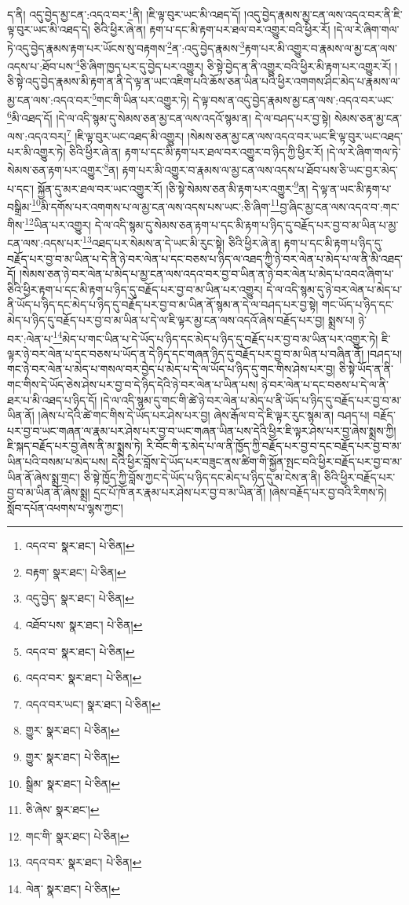 ད་ནི། འདུ་བྱེད་མྱ་ངན་:འདའ་བར་\footnote{འདའ་བ་  སྣར་ཐང་།  པེ་ཅིན། }ནི། །ཇི་ལྟ་བུར་ཡང་མི་འཐད་དོ། །འདུ་བྱེད་རྣམས་མྱ་ངན་ལས་འདའ་བར་ནི་ཇི་ལྟ་བུར་ཡང་མི་འཐད་དེ། ཅིའི་ཕྱིར་ཞེ་ན། རྟག་པ་དང་མི་རྟག་པར་ཐལ་བར་འགྱུར་བའི་ཕྱིར་རོ། །དེ་ལ་རེ་ཞིག་གལ་ཏེ་འདུ་བྱེད་རྣམས་རྟག་པར་ཡོངས་སུ་བརྟགས་\footnote{བརྟག་  སྣར་ཐང་།  པེ་ཅིན། }ན་:འདུ་བྱེད་རྣམས་\footnote{འདུ་བྱེད་  སྣར་ཐང་།  པེ་ཅིན། }རྟག་པར་མི་འགྱུར་བ་རྣམས་ལ་མྱ་ངན་ལས་འདས་པ་:ཐོབ་པས་\footnote{འཐོབ་པས་  སྣར་ཐང་།  པེ་ཅིན། }ཅི་ཞིག་ཁྱད་པར་དུ་བྱེད་པར་འགྱུར། ཅི་སྟེ་བྱེད་ན་ནི་འགྱུར་བའི་ཕྱིར་མི་རྟག་པར་འགྱུར་རོ། །ཅི་སྟེ་འདུ་བྱེད་རྣམས་མི་རྟག་ན་ནི་དེ་ལྟ་ན་ཡང་འཇིག་པའི་ཆོས་ཅན་ཡིན་པའི་ཕྱིར་འགགས་ཤིང་མེད་པ་རྣམས་ལ་མྱ་ངན་ལས་:འདའ་བར་\footnote{འདའ་བ་  སྣར་ཐང་།  པེ་ཅིན། }གང་གི་ཡིན་པར་འགྱུར་ཏེ། དེ་ལྟ་བས་ན་འདུ་བྱེད་རྣམས་མྱ་ངན་ལས་:འདའ་བར་ཡང་\footnote{འདའ་བར་  སྣར་ཐང་།  པེ་ཅིན། }མི་འཐད་དོ། །དེ་ལ་འདི་སྙམ་དུ་སེམས་ཅན་མྱ་ངན་ལས་འདའོ་སྙམ་ན། དེ་ལ་བཤད་པར་བྱ་སྟེ། སེམས་ཅན་མྱ་ངན་ལས་:འདའ་བར།\footnote{འདའ་བར་ཡང་།  སྣར་ཐང་།  པེ་ཅིན། } །ཇི་ལྟ་བུར་ཡང་འཐད་མི་འགྱུར། །སེམས་ཅན་མྱ་ངན་ལས་འདའ་བར་ཡང་ཇི་ལྟ་བུར་ཡང་འཐད་པར་མི་འགྱུར་ཏེ། ཅིའི་ཕྱིར་ཞེ་ན། རྟག་པ་དང་མི་རྟག་པར་ཐལ་བར་འགྱུར་བ་ཉིད་ཀྱི་ཕྱིར་རོ། །དེ་ལ་རེ་ཞིག་གལ་ཏེ་སེམས་ཅན་རྟག་པར་འགྱུར་\footnote{གྱུར་  སྣར་ཐང་།  པེ་ཅིན། }ན། རྟག་པར་མི་འགྱུར་བ་རྣམས་ལ་མྱ་ངན་ལས་འདས་པ་ཐོབ་པས་ཅི་ཡང་བྱར་མེད་པ་དང་། སྐྱོན་དུ་མར་ཐལ་བར་ཡང་འགྱུར་རོ། །ཅི་སྟེ་སེམས་ཅན་མི་རྟག་པར་འགྱུར་\footnote{གྱུར་  སྣར་ཐང་།  པེ་ཅིན། }ན། དེ་ལྟ་ན་ཡང་མི་རྟག་པ་བསྒྲིམ་\footnote{སྒྲིམ་  སྣར་ཐང་།  པེ་ཅིན། }མི་དགོས་པར་འགགས་པ་ལ་མྱ་ངན་ལས་འདས་པས་ཡང་:ཅི་ཞིག་\footnote{ཅི་ཞེས་  སྣར་ཐང་། }བྱ་ཞིང་མྱ་ངན་ལས་འདའ་བ་:གང་གིས་\footnote{གང་གི་  སྣར་ཐང་།  པེ་ཅིན། }ཡིན་པར་འགྱུར། དེ་ལ་འདི་སྙམ་དུ་སེམས་ཅན་རྟག་པ་དང་མི་རྟག་པ་ཉིད་དུ་བརྗོད་པར་བྱ་བ་མ་ཡིན་པ་མྱ་ངན་ལས་:འདས་པར་\footnote{འདའ་བར་  སྣར་ཐང་།  པེ་ཅིན། }འཐད་པར་སེམས་ན་དེ་ཡང་མི་རུང་སྟེ། ཅིའི་ཕྱིར་ཞེ་ན། རྟག་པ་དང་མི་རྟག་པ་ཉིད་དུ་བརྗོད་པར་བྱ་བ་མ་ཡིན་པ་དེ་ནི་ཉེ་བར་ལེན་པ་དང་བཅས་པ་ཉིད་ལ་འཐད་ཀྱི་ཉེ་བར་ལེན་པ་མེད་པ་ལ་ནི་མི་འཐད་དོ། །སེམས་ཅན་ཉེ་བར་ལེན་པ་མེད་པ་མྱ་ངན་ལས་འདའ་བར་བྱ་བ་ཡིན་ན་ཉེ་བར་ལེན་པ་མེད་པ་འབའ་ཞིག་པ་ཅིའི་ཕྱིར་རྟག་པ་དང་མི་རྟག་པ་ཉིད་དུ་བརྗོད་པར་བྱ་བ་མ་ཡིན་པར་འགྱུར། དེ་ལ་འདི་སྙམ་དུ་ཉེ་བར་ལེན་པ་མེད་པ་ནི་ཡོད་པ་ཉིད་དང་མེད་པ་ཉིད་དུ་བརྗོད་པར་བྱ་བ་མ་ཡིན་ནོ་སྙམ་ན་དེ་ལ་བཤད་པར་བྱ་སྟེ། གང་ཡོད་པ་ཉིད་དང་མེད་པ་ཉིད་དུ་བརྗོད་པར་བྱ་བ་མ་ཡིན་པ་དེ་ལ་ཇི་ལྟར་མྱ་ངན་ལས་འདའོ་ཞེས་བརྗོད་པར་བྱ། སྨྲས་པ། ཉེ་བར་:ལེན་པ་\footnote{ལེན་  སྣར་ཐང་།  པེ་ཅིན། }མེད་པ་གང་ཡིན་པ་དེ་ཡོད་པ་ཉིད་དང་མེད་པ་ཉིད་དུ་བརྗོད་པར་བྱ་བ་མ་ཡིན་པར་འགྱུར་ཏེ། ཇི་ལྟར་ཉེ་བར་ལེན་པ་དང་བཅས་པ་ཡོད་ན་དེ་ཉིད་དང་གཞན་ཉིད་དུ་བརྗོད་པར་བྱ་བ་མ་ཡིན་པ་བཞིན་ནོ། །བཤད་པ། གང་ཉེ་བར་ལེན་པ་མེད་པ་གསལ་བར་བྱེད་པ་མེད་པ་དེ་ལ་ཡོད་པ་ཉིད་དུ་གང་གིས་ཤེས་པར་བྱ། ཅི་སྟེ་ཡོད་ན་ནི་གང་གིས་དེ་ཡོད་ཅེས་ཤེས་པར་བྱ་བ་དེ་ཉིད་དེའི་ཉེ་བར་ལེན་པ་ཡིན་པས། ཉེ་བར་ལེན་པ་དང་བཅས་པ་དེ་ལ་ནི་ཐར་པ་མི་འཐད་པ་ཉིད་དོ། །དེ་ལ་འདི་སྙམ་དུ་གང་གི་ཚེ་ཉེ་བར་ལེན་པ་མེད་པ་ནི་ཡོད་པ་ཉིད་དུ་བརྗོད་པར་བྱ་བ་མ་ཡིན་ནོ། །ཞེས་པ་དེའི་ཚེ་གང་གིས་དེ་ཡོད་པར་ཤེས་པར་བྱ། ཞེས་རྒོལ་བ་དེ་ཇི་ལྟར་རུང་སྙམ་ན། བཤད་པ། བརྗོད་པར་བྱ་བ་ཡང་གཞན་ལ་རྣམ་པར་ཤེས་པར་བྱ་བ་ཡང་གཞན་ཡིན་པས་དེའི་ཕྱིར་ཇི་ལྟར་ཤེས་པར་བྱ་ཞེས་སྨྲས་ཀྱི། ཇི་སྐད་བརྗོད་པར་བྱ་ཞེས་ནི་མ་སྨྲས་ཏེ། རི་བོང་གི་རྭ་མེད་པ་ལ་ནི་ཁྱོད་ཀྱི་བརྗོད་པར་བྱ་བ་དང་བརྗོད་པར་བྱ་བ་མ་ཡིན་པའི་བསམ་པ་མེད་པས། དེའི་ཕྱིར་བློས་དེ་ཡོད་པར་བཟུང་ནས་ཚིག་གི་སྐྱོན་སྤང་བའི་ཕྱིར་བརྗོད་པར་བྱ་བ་མ་ཡིན་ནོ་ཞེས་སྨྲ་གྲང་། ཅི་སྟེ་ཁྱོད་ཀྱི་བློས་ཀྱང་དེ་ཡོད་པ་ཉིད་དང་མེད་པ་ཉིད་དུ་མ་ངེས་ན་ནི། ཅིའི་ཕྱིར་བརྗོད་པར་བྱ་བ་མ་ཡིན་ནོ་ཞེས་སྨྲ། དྲང་པོ་ཁོ་ནར་རྣམ་པར་ཤེས་པར་བྱ་བ་མ་ཡིན་ནོ། །ཞེས་བརྗོད་པར་བྱ་བའི་རིགས་ཏེ། སློབ་དཔོན་འཕགས་པ་ལྷས་ཀྱང་། 